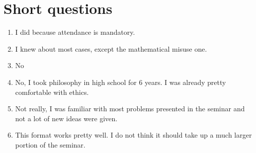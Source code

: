 \documentclass{article}
\begin{document}
\section*{Short questions}
\begin{enumerate}
    \item I did because attendance is mandatory.
    \item I knew about most cases, except the mathematical misuse one.
    \item No
    \item No, I took philosophy in high school for 6 years. I was already pretty
          comfortable with ethics.
    \item Not really, I was familiar with most problems presented in the
          seminar and not a lot of new ideas were given.
    \item This format works pretty well. I do not think it should take up a much
          larger portion of the seminar.
\end{enumerate}
\end{document}
